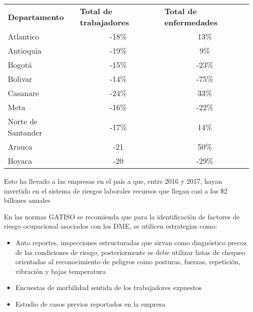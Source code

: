 \begin{table}[H]
\begin{tabular}{lcc}
\textbf{Departamento} & \multicolumn{1}{l}{\textbf{Total de trabajadores}} & \multicolumn{1}{l}{\textbf{Total de enfermedades}} \\
Atlantico             & -18\%                                              & 13\%                                               \\
Antioquia             & -19\%                                              & 9\%                                                \\
Bogotá                & -15\%                                              & -23\%                                              \\
Bolivar               & -14\%                                              & -75\%                                              \\
Casanare              & -24\%                                              & 33\%                                               \\
Meta                  & -16\%                                              & -22\%                                              \\
Norte de Santander    & -17\%                                              & 14\%                                               \\
Arauca                & -21                                                & 50\%                                               \\
Boyaca                & -20                                                & -29\%                                             
\end{tabular}
\end{table}

Esto ha llevado a las empresas en el país a que, entre 2016 y 2017, hayan invertido en el sistema de riesgos laborales recursos que llegan casi a los \$2 billones anuales 


En las normas GATISO se recomienda que para la identificación de factores de riesgo ocupacional asociados con los DME, se utilicen estrategias como:
\begin{itemize}
    \item Auto reportes, inspecciones estructuradas que sirvan como diagnóstico precoz de las condiciones de riesgo, posteriormente se debe utilizar listas de chequeo orientadas al reconocimiento de peligros como posturas, fuerzas, repetición, vibración y bajas temperatura
    \item Encuestas de morbilidad sentida de los trabajadores expuestos
    \item Estudio de casos previos reportados en la empresa
\end{itemize}


